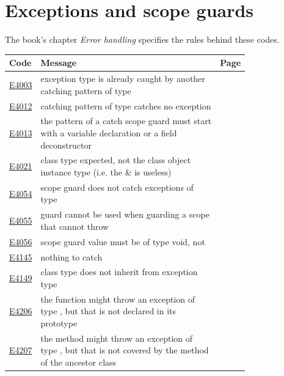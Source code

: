 
\clearpage
\section{Exceptions and scope guards}
\label{sec:codes:errors}

The book's chapter \textit{Error handling} specifies the rules behind these codes.

\begin{longtable}{@{}l p{0.78\linewidth} r@{}}
\toprule Code & Message & Page\\ \midrule \endhead
\hyperref[sec:codes:e4003]{E4003} & exception type \errhole{} is already caught by another catching pattern of type \errhole{} & \pageref{sec:codes:e4003}\\
\hyperref[sec:codes:e4012]{E4012} & catching pattern of type \errhole{} catches no exception & \pageref{sec:codes:e4012}\\
\hyperref[sec:codes:e4013]{E4013} & the pattern of a catch scope guard must start with a variable declaration or a field deconstructor & \pageref{sec:codes:e4013}\\
\hyperref[sec:codes:e4021]{E4021} & class type expected, not the class object instance type \errhole{} (i.e. the \& is useless) & \pageref{sec:codes:e4021}\\
\hyperref[sec:codes:e4054]{E4054} & scope guard does not catch exceptions of type \errhole{} & \pageref{sec:codes:e4054}\\
\hyperref[sec:codes:e4055]{E4055} & \errhole{} guard cannot be used when guarding a scope that cannot throw & \pageref{sec:codes:e4055}\\
\hyperref[sec:codes:e4056]{E4056} & \errhole{} scope guard value must be of type void, not \errhole{} & \pageref{sec:codes:e4056}\\
\hyperref[sec:codes:e4145]{E4145} & nothing to catch & \pageref{sec:codes:e4145}\\
\hyperref[sec:codes:e4149]{E4149} & class type \errhole{} does not inherit from exception type \errhole{} & \pageref{sec:codes:e4149}\\
\hyperref[sec:codes:e4206]{E4206} & the function \errhole{} might throw an exception of type \errhole{}, but that is not declared in its prototype & \pageref{sec:codes:e4206}\\
\hyperref[sec:codes:e4207]{E4207} & the method might throw an exception of type \errhole{}, but that is not covered by the method of the ancestor class & \pageref{sec:codes:e4207}\\

\end{longtable}
